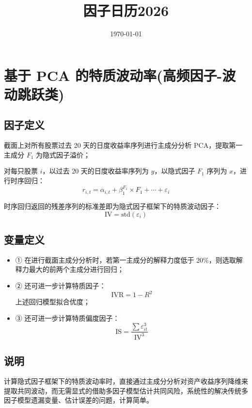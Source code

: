 \documentclass{article}
\title{因子日历2026}
\date{\today}
\begin{document}
\maketitle

\section{基于 PCA 的特质波动率(高频因子-波动跳跃类)}

\subsection{因子定义}

截面上对所有股票过去 20 天的日度收益率序列进行主成分分析 PCA，提取第一主成分 \( F_1 \) 为隐式因子溢价；

对每只股票 \( i \)，以过去 20 天的日度收益率序列为 \( y \)，以隐式因子 \( F_1 \) 序列为 \( x \)，进行时序回归：
\begin{equation}
    r_{i,t} = \alpha_{i,t} + \beta_1^{F_1} \times F_1 + \cdots + \varepsilon_i
\end{equation}

时序回归返回的残差序列的标准差即为隐式因子框架下的特质波动因子：
\begin{equation}
    \mathrm{IV} = \mathrm{std}(\varepsilon_i)
\end{equation}

\subsection{变量定义}
\begin{itemize}
    \item ① 在进行截面主成分分析时，若第一主成分的解释力度低于 20\%，则选取解释力最大的前两个主成分进行回归；
    \item ② 还可进一步计算特质因子：
        \begin{equation*}
            \mathrm{IVR} = 1 - R^2
        \end{equation*}
        上述回归模型拟合优度；
    \item ③ 还可进一步计算特质偏度因子：
        \begin{equation*}
            \mathrm{IS} = \frac{\sum \varepsilon_{it}^3}{\mathrm{IV}^3}
        \end{equation*}
\end{itemize}

\subsection{说明}
计算隐式因子框架下的特质波动率时，直接通过主成分分析对资产收益序列降维来提取共同波动，而无需显式的借助多因子模型估计共同风险，系统性的解决传统多因子模型遗漏变量、估计误差的问题，计算简单。
\end{document}
